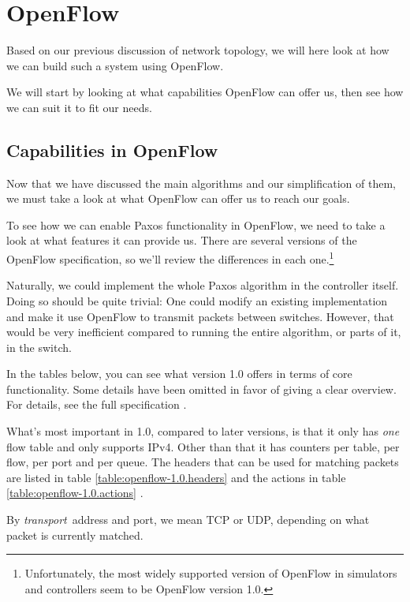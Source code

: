 \section{OpenFlow}
\label{chapter:openflow.design}

Based on our previous discussion of network topology, we will here look at
how we can build such a system using OpenFlow.

We will start by looking at what capabilities OpenFlow can offer us, then
see how we can suit it to fit our needs.

\subsection{Capabilities in OpenFlow}
\label{chapter:details.openflow}

Now that we have discussed the main algorithms and our simplification of
them, we must take a look at what OpenFlow can offer us to reach our goals.

To see how we can enable Paxos functionality in OpenFlow, we need to take a
look at what features it can provide us.  There are several versions of the
OpenFlow specification, so we'll review the differences in each
one.\footnote{Unfortunately, the most widely supported version of OpenFlow in
simulators and controllers seem to be OpenFlow version 1.0.}

Naturally, we could implement the whole Paxos algorithm in the controller
itself.  Doing so should be quite trivial: One could modify an existing
implementation and make it use OpenFlow to transmit packets between
switches.  However, that would be very inefficient compared to running the
entire algorithm, or parts of it, in the switch.

In the tables below, you can see what version 1.0 offers in terms of core
functionality.  Some details have been omitted in favor of giving a clear
overview.  For details, see the full specification \cite{openflow-1.0}.

What's most important in 1.0, compared to later versions, is that it only
has \textit{one} flow table and only supports IPv4.  Other than that it has
counters per table, per flow, per port and per queue.  The headers that can
be used for matching packets are listed in table
\ref{table:openflow-1.0.headers}  and
the actions in table \ref{table:openflow-1.0.actions}
.

By \textit{transport} address and port, we mean \ac{TCP} or \ac{UDP},
depending on what packet is currently matched.

